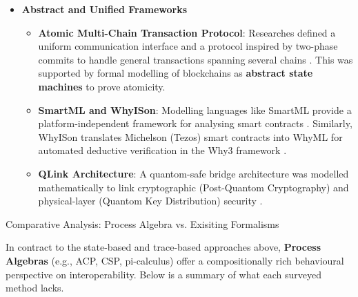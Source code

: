\begin{itemize}
  \begin{itemize}
  \tightlist
  \item
    \textbf{Pub-Sub Interoperability Protocol}: This protocol, which
    establishes communication between Hyperledger Fabric and Besu
    networks via a broker, was formalised as stochastic timed automata
    (STA) \citep{Alam_2023}. Using UPPAAL-SMC, researchers verified
    real-time properties and provided probabilistic estimations for
    message delivery, revealing an 8\% probability of failure when the
    broker\textquotesingle s throughput is significantly higher than
    that of the publishers and subscribers.
  \end{itemize}
\item
  \textbf{Abstract and Unified Frameworks}

  \begin{itemize}
  \tightlist
  \item
    \textbf{Atomic Multi-Chain Transaction Protocol}: Researches defined
    a uniform communication interface and a protocol inspired by
    two-phase commits to handle general transactions spanning several
    chains \citep{lu2024atomicity}. This was supported by formal
    modelling of blockchains as \textbf{abstract state machines} to
    prove atomicity.
  \item
    \textbf{SmartML and WhyISon}: Modelling languages like SmartML
    provide a platform-independent framework for analysing smart
    contracts \citep{veschetti2024smartmlmodelinglanguagesmart}.
    Similarly, WhyISon translates Michelson (Tezos) smart contracts into
    WhyML for automated deductive verification in the Why3 framework
    \citep{horta2020}.
  \item
    \textbf{QLink Architecture}: A quantom-safe bridge architecture was
    modelled mathematically to link cryptographic (Post-Quantom
    Cryptography) and physical-layer (Quantom Key Distribution) security
    \citep{silva2025}.
  \end{itemize}
\end{itemize}

Comparative Analysis: Process Algebra vs. Exisiting Formalisms

In contract to the state-based and trace-based approaches above,
\textbf{Process Algebras} (e.g., ACP, CSP, pi-calculus) offer a
compositionally rich behavioural perspective on interoperability. Below
is a summary of what each surveyed method lacks.

